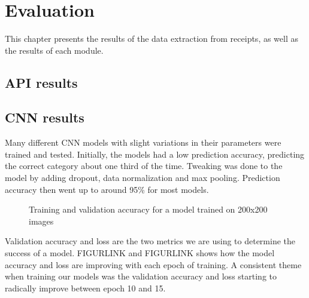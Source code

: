 \chapter{Evaluation}
\label{ch:evaluation}
This chapter presents the results of the data extraction from receipts, as well as the results of each module.

\section{API results}\label{sec:api-results}


\section{CNN results}\label{sec:cnn-results}
Many different CNN models with slight variations in their parameters were trained and tested.
Initially, the models had a low prediction accuracy, predicting the correct category about one third of the time.
Tweaking was done to the model by adding dropout, data normalization and max pooling.
Prediction accuracy then went up to around 95\% for most models.

\begin{figure}[h]
    \caption{Training and validation accuracy for a model trained on 200x200 images}
    \label{fig:figure3.2}
\end{figure}

Validation accuracy and loss are the two metrics we are using to determine the success of a model.
FIGURLINK and FIGURLINK shows how the model accuracy and loss are improving with each epoch of training.
A consistent theme when training our models was the validation accuracy and loss starting to radically improve between epoch 10 and 15.

